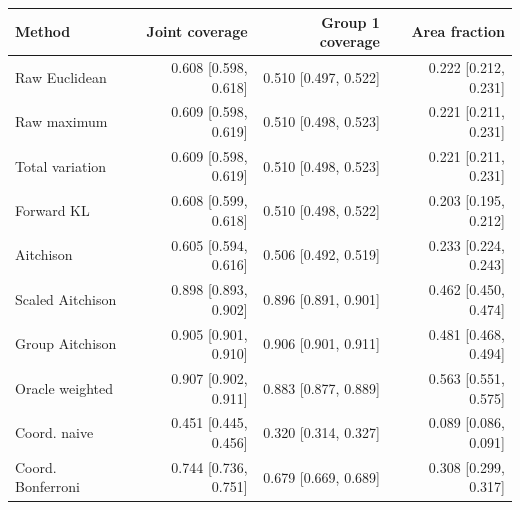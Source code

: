 \begin{tabular}{lrrr}
\toprule
Method & Joint coverage & Group 1 coverage & Area fraction \\
\midrule
Raw Euclidean & 0.608 [0.598, 0.618] & 0.510 [0.497, 0.522] & 0.222 [0.212, 0.231] \\
Raw maximum & 0.609 [0.598, 0.619] & 0.510 [0.498, 0.523] & 0.221 [0.211, 0.231] \\
Total variation & 0.609 [0.598, 0.619] & 0.510 [0.498, 0.523] & 0.221 [0.211, 0.231] \\
Forward KL & 0.608 [0.599, 0.618] & 0.510 [0.498, 0.522] & 0.203 [0.195, 0.212] \\
Aitchison & 0.605 [0.594, 0.616] & 0.506 [0.492, 0.519] & 0.233 [0.224, 0.243] \\
Scaled Aitchison & 0.898 [0.893, 0.902] & 0.896 [0.891, 0.901] & 0.462 [0.450, 0.474] \\
Group Aitchison & 0.905 [0.901, 0.910] & 0.906 [0.901, 0.911] & 0.481 [0.468, 0.494] \\
Oracle weighted & 0.907 [0.902, 0.911] & 0.883 [0.877, 0.889] & 0.563 [0.551, 0.575] \\
Coord. naive & 0.451 [0.445, 0.456] & 0.320 [0.314, 0.327] & 0.089 [0.086, 0.091] \\
Coord. Bonferroni & 0.744 [0.736, 0.751] & 0.679 [0.669, 0.689] & 0.308 [0.299, 0.317] \\
\bottomrule
\end{tabular}
